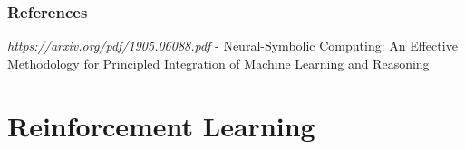 \documentclass[12pt,a4paper,twoside,openright]{scrbook}
\begin{document}
 \subsection{References}
 \textit{https://arxiv.org/pdf/1905.06088.pdf} - Neural-Symbolic Computing: An Effective Methodology for Principled Integration of Machine Learning and Reasoning


\chapter{Reinforcement Learning}


 
\end{document}

